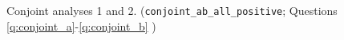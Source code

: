 \begin{figure}[h!]
    \cprotect\caption[Conjoint analyses 1 and 2]{Conjoint analyses 1 and 2. (\verb|conjoint_ab_all_positive|; Questions \ref{q:conjoint_a}-\ref{q:conjoint_b}%
    )}\label{fig:conjoint}
\end{figure}



